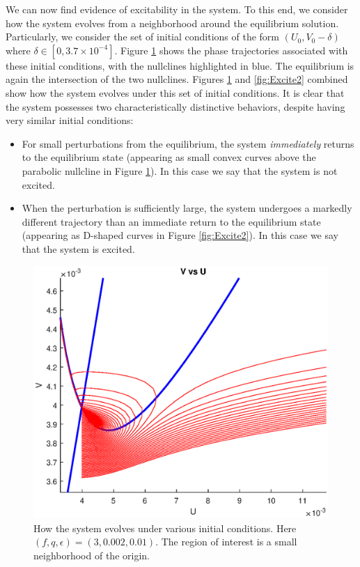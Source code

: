 \documentclass[twocolumn,amsmath,amssymb,aps]{revtex4}
\begin{document}
We can now find evidence of excitability in the system. To this end, we consider how the system evolves from a neighborhood around the equilibrium solution. Particularly, we consider the set of initial conditions of the form $(U_0, V_0 - \delta)$ where $\delta \in [0, 3.7\times 10^{-4}]$. Figure \ref{fig:Excite1} shows the phase trajectories associated with these initial conditions, with the nullclines highlighted in blue. The equilibrium is again the intersection of the two nullclines. Figures \ref{fig:Excite1} and \ref{fig:Excite2} combined show how the system evolves under this set of initial conditions. It is clear that the system possesses two characteristically distinctive behaviors, despite having very similar initial conditions:
\begin{itemize}
	\item For small perturbations from the equilibrium, the system \textit{immediately} returns to the equilibrium state (appearing as small convex curves above the parabolic nullcline in Figure \ref{fig:Excite1}). In this case we say that the system is not excited.
	\item When the perturbation is sufficiently large, the system undergoes a markedly different trajectory than an immediate return to the equilibrium state (appearing as D-shaped curves in Figure \ref{fig:Excite2}). In this case we say that the system is excited.
\end{itemize}
\begin{figure}[!htb]
	\centering
	\includegraphics[scale=0.55]{excite_1.eps}
	\caption{How the system evolves under various initial conditions. Here $(f,q,\epsilon) = (3,0.002, 0.01)$. The region of interest is a small neighborhood of the origin.}
	\label{fig:Excite1}
\end{figure}
\end{document}
